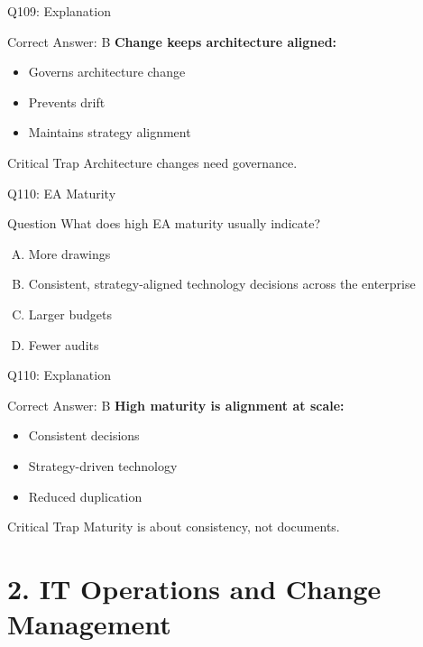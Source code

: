 \documentclass{beamer}
\begin{document}
	\begin{frame}{Q109: Explanation}
		\begin{block}{Correct Answer: B}
			\textbf{Change keeps architecture aligned:}
			\begin{itemize}
				\item Governs architecture change
				\item Prevents drift
				\item Maintains strategy alignment
			\end{itemize}
		\end{block}
		\begin{alertblock}{Critical Trap}
			Architecture changes need governance.
		\end{alertblock}
	\end{frame}
	
	\begin{frame}{Q110: EA Maturity}
		\begin{block}{Question}
			What does high EA maturity usually indicate?
		\end{block}
		\begin{enumerate}[(A)]
			\item More drawings
			\item Consistent, strategy-aligned technology decisions across the enterprise
			\item Larger budgets
			\item Fewer audits
		\end{enumerate}
	\end{frame}
	
	\begin{frame}{Q110: Explanation}
		\begin{block}{Correct Answer: B}
			\textbf{High maturity is alignment at scale:}
			\begin{itemize}
				\item Consistent decisions
				\item Strategy-driven technology
				\item Reduced duplication
			\end{itemize}
		\end{block}
		\begin{alertblock}{Critical Trap}
			Maturity is about consistency, not documents.
		\end{alertblock}
	\end{frame}
	
	\section{2. IT Operations and Change Management}
	
\end{document}

